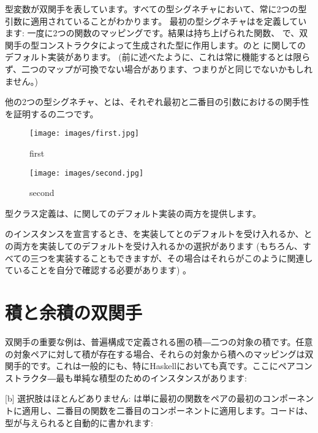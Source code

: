 型変数が双関手を表しています。すべての型シグネチャにおいて、常に2つの型引数に適用されていることがわかります。
最初の型シグネチャはを定義しています: 一度に2つの関数のマッピングです。結果は持ち上げられた関数、
で、双関手の型コンストラクタによって生成された型に作用します。のと
に関してのデフォルト実装があります。 (前に述べたように、これは常に機能するとは限らず、二つのマップが可換でない場合があります、つまりがと同じでないかもしれません。) 

\noindent
他の2つの型シグネチャ、とは、それぞれ最初と二番目の引数におけるの関手性を証明するの二つです。

\begin{figure}[H]
  \centering
  \begin{minipage}{0.45\textwidth}
    \centering
    \texttt{[image: images/first.jpg]} %
    \caption{first}
  \end{minipage}\hfill
  \begin{minipage}{0.45\textwidth}
    \centering
    \texttt{[image: images/second.jpg]} %
    \caption{second}
  \end{minipage}
\end{figure}

\noindent
型クラス定義は、に関してのデフォルト実装の両方を提供します。

のインスタンスを宣言するとき、を実装してとのデフォルトを受け入れるか、との両方を実装してのデフォルトを受け入れるかの選択があります (もちろん、すべての三つを実装することもできますが、その場合はそれらがこのように関連していることを自分で確認する必要があります) 。

\section{積と余積の双関手}

双関手の重要な例は、普遍構成で定義される圏の積―二つの対象の積です。任意の対象ペアに対して積が存在する場合、それらの対象から積へのマッピングは双関手的です。これは一般的にも、特にHaskellにおいても真です。ここにペアコンストラクタ―最も単純な積型のためのインスタンスがあります: 

[b]
選択肢はほとんどありません: は単に最初の関数をペアの最初のコンポーネントに適用し、二番目の関数を二番目のコンポーネントに適用します。コードは、型が与えられると自動的に書かれます: 

